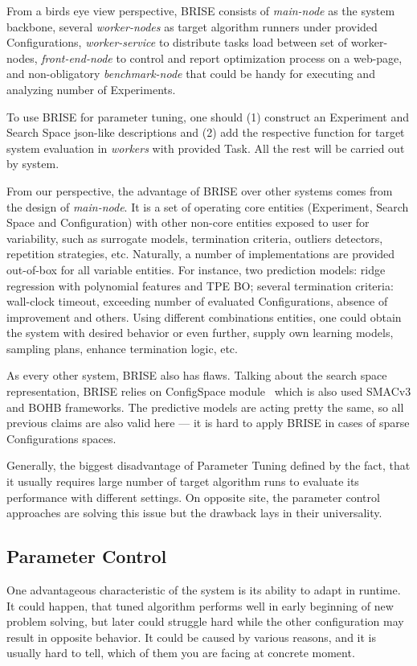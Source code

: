 From a birds eye view perspective, BRISE consists of \textit{main-node} as the system backbone, several \textit{worker-nodes} as target algorithm runners under provided Configurations, \textit{worker-service} to distribute tasks load between set of worker-nodes, \textit{front-end-node} to control and report optimization process on a web-page, and non-obligatory \textit{benchmark-node} that could be handy for executing and analyzing number of Experiments.

To use BRISE for parameter tuning, one should (1) construct an Experiment and Search Space json-like descriptions and (2) add the respective function for target system evaluation in \textit{workers} with provided Task. All the rest will be carried out by system.

From our perspective, the advantage of BRISE over other systems comes from the design of \textit{main-node}. It is a set of operating core entities (Experiment, Search Space and Configuration) with other non-core entities exposed to user for variability, such as surrogate models, termination criteria, outliers detectors, repetition strategies, etc. Naturally, a number of implementations are provided out-of-box for all variable entities. For instance, two prediction models: ridge regression with polynomial features and TPE BO; several termination criteria: wall-clock timeout, exceeding number of evaluated Configurations, absence of improvement and others. Using different combinations entities, one could obtain the system with desired behavior or even further, supply own learning models, sampling plans, enhance termination logic, etc.

As every other system, BRISE also has flaws. Talking about the search space representation, BRISE relies on ConfigSpace module~\cite{configspace} which is also used SMACv3 and BOHB frameworks. The predictive models are acting pretty the same, so all previous claims are also valid here — it is hard to apply BRISE in cases of sparse Configurations spaces.


Generally, the biggest disadvantage of Parameter Tuning defined by the fact, that it usually requires large number of target algorithm runs to evaluate its performance with different settings.
On opposite site, the parameter control approaches are solving this issue but the drawback lays in their universality.


\subsection{Parameter Control}\label{bg: parameter control}
One advantageous characteristic of the system is its ability to adapt in runtime.
It could happen, that tuned algorithm performs well in early beginning of new problem solving, but later could struggle hard while the other configuration may result in opposite behavior. It could be caused by various reasons, and it is usually hard to tell, which of them you are facing at concrete moment. 


